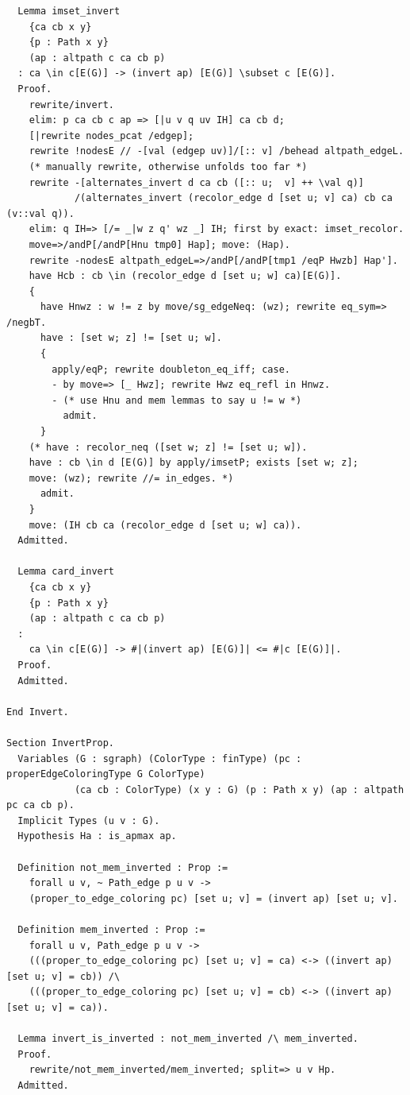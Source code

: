 \begin{verbatim}
  Lemma imset_invert 
    {ca cb x y} 
    {p : Path x y} 
    (ap : altpath c ca cb p)
  : ca \in c[E(G)] -> (invert ap) [E(G)] \subset c [E(G)].
  Proof.
    rewrite/invert.
    elim: p ca cb c ap => [|u v q uv IH] ca cb d; 
    [|rewrite nodes_pcat /edgep]; 
    rewrite !nodesE // -[val (edgep uv)]/[:: v] /behead altpath_edgeL.
    (* manually rewrite, otherwise unfolds too far *)
    rewrite -[alternates_invert d ca cb ([:: u;  v] ++ \val q)]
            /(alternates_invert (recolor_edge d [set u; v] ca) cb ca (v::val q)).
    elim: q IH=> [/= _|w z q' wz _] IH; first by exact: imset_recolor.
    move=>/andP[/andP[Hnu tmp0] Hap]; move: (Hap). 
    rewrite -nodesE altpath_edgeL=>/andP[/andP[tmp1 /eqP Hwzb] Hap'].
    have Hcb : cb \in (recolor_edge d [set u; w] ca)[E(G)].
    {
      have Hnwz : w != z by move/sg_edgeNeq: (wz); rewrite eq_sym=> /negbT.
      have : [set w; z] != [set u; w].
      {
        apply/eqP; rewrite doubleton_eq_iff; case.
        - by move=> [_ Hwz]; rewrite Hwz eq_refl in Hnwz.
        - (* use Hnu and mem lemmas to say u != w *)
          admit.
      }  
    (* have : recolor_neq ([set w; z] != [set u; w]).  
    have : cb \in d [E(G)] by apply/imsetP; exists [set w; z];
    move: (wz); rewrite //= in_edges. *)
      admit.
    }
    move: (IH cb ca (recolor_edge d [set u; w] ca)).
  Admitted.

  Lemma card_invert 
    {ca cb x y} 
    {p : Path x y} 
    (ap : altpath c ca cb p)
  :
    ca \in c[E(G)] -> #|(invert ap) [E(G)]| <= #|c [E(G)]|.
  Proof.
  Admitted.

End Invert.

Section InvertProp.
  Variables (G : sgraph) (ColorType : finType) (pc : properEdgeColoringType G ColorType) 
            (ca cb : ColorType) (x y : G) (p : Path x y) (ap : altpath pc ca cb p).
  Implicit Types (u v : G).
  Hypothesis Ha : is_apmax ap.

  Definition not_mem_inverted : Prop := 
    forall u v, ~ Path_edge p u v -> 
    (proper_to_edge_coloring pc) [set u; v] = (invert ap) [set u; v].
  
  Definition mem_inverted : Prop :=
    forall u v, Path_edge p u v ->
    (((proper_to_edge_coloring pc) [set u; v] = ca) <-> ((invert ap) [set u; v] = cb)) /\
    (((proper_to_edge_coloring pc) [set u; v] = cb) <-> ((invert ap) [set u; v] = ca)).

  Lemma invert_is_inverted : not_mem_inverted /\ mem_inverted.
  Proof.
    rewrite/not_mem_inverted/mem_inverted; split=> u v Hp.
  Admitted.


\end{verbatim}

